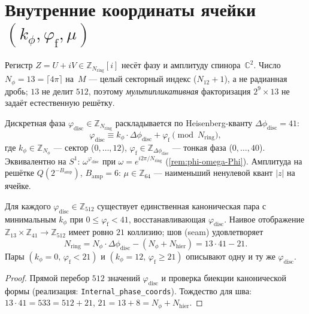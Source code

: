 \section{Внутренние координаты ячейки \texorpdfstring{$(k_\phi,\varphi_{\mathrm{f}},\mu)$}{(kphi,phif,mu)}}
\label{sec:coords-internal}

Регистр $Z=U+iV\in\mathbb{Z}_{N_{\mathrm{ring}}}[i]$ несёт фазу и амплитуду спинора~$\mathbb{C}^2$.
Число $N_\phi=13=\lceil 4\pi\rceil$ на~$M$ --- целый секторный индекс ($N_{12}+1$),
а не радианная дробь; $13$ не делит $512$, поэтому \emph{мультипликативная}
факторизация $2^9\times 13$ не задаёт естественную решётку.

\begin{definition}
\label{def:internal-coords}
Дискретная фаза $\varphi_{\mathrm{disc}}\in\mathbb{Z}_{N_{\mathrm{ring}}}$ раскладывается по Heisenberg-кванту
$\Delta\phi_{\mathrm{disc}}=41$:
\[
  \varphi_{\mathrm{disc}} \equiv k_\phi\cdot\Delta\phi_{\mathrm{disc}}+\varphi_{\mathrm{f}}
  \pmod{N_{\mathrm{ring}}},
\]
где $k_\phi\in\mathbb{Z}_{N_\phi}$ --- сектор ($0,\ldots,12$),
$\varphi_{\mathrm{f}}\in\mathbb{Z}_{\Delta\phi_{\mathrm{disc}}}$ --- тонкая фаза ($0,\ldots,40$).
Эквивалентно на $S^1$: $\omega^{\varphi_{\mathrm{disc}}}$ при $\omega=e^{i2\pi/N_{\mathrm{ring}}}$ (\cref{rem:phi-omega-Phi}).
Амплитуда на решётке $Q(2^{-B_{\mathrm{amp}}})$, $B_{\mathrm{amp}}=6$:
$\mu\in\mathbb{Z}_{64}$ --- наименьший ненулевой квант $|z|$ на ячейке.
\end{definition}

\begin{proposition}
\label{prop:canonical-phase}
Для каждого $\varphi_{\mathrm{disc}}\in\mathbb{Z}_{512}$ существует единственная каноническая пара
с минимальным $k_\phi$ при $0\le\varphi_{\mathrm{f}}<41$, восстанавливающая $\varphi_{\mathrm{disc}}$.
Наивое отображение $\mathbb{Z}_{13}\times\mathbb{Z}_{41}\to\mathbb{Z}_{512}$
имеет ровно $21$ коллизию; шов (seam) удовлетворяет
\[
  N_{\mathrm{ring}}
  =N_\phi\cdot\Delta\phi_{\mathrm{disc}}-(N_\phi+N_{\mathrm{hier}})
  =13\cdot 41-21.
\]
Пары $(k_\phi=0,\,\varphi_{\mathrm{f}}<21)$ и $(k_\phi=12,\,\varphi_{\mathrm{f}}\ge 21)$
описывают одну и ту же $\varphi_{\mathrm{disc}}$.
\end{proposition}

\begin{proof}
Прямой перебор $512$ значений $\varphi_{\mathrm{disc}}$ и проверка биекции канонической формы
(реализация: \texttt{Internal\_phase\_coords}).
Тождество для шва: $13\cdot 41=533=512+21$, $21=13+8=N_\phi+N_{\mathrm{hier}}$.
\end{proof}


